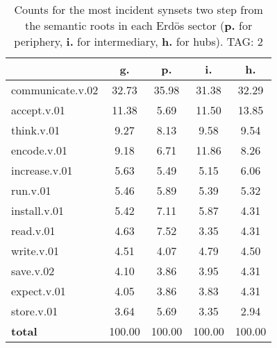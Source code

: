 \begin{table}[h!]
\begin{center}
\begin{tabular}{| l | c | c | c | c |}\hline
 & g. & p. & i. & h. \\\hline
communicate.v.02 & 32.73  & 35.98  & 31.38  & 32.29 \\\hline
accept.v.01 & 11.38  & 5.69  & 11.50  & 13.85 \\\hline
think.v.01 & 9.27  & 8.13  & 9.58  & 9.54 \\\hline
encode.v.01 & 9.18  & 6.71  & 11.86  & 8.26 \\\hline
increase.v.01 & 5.63  & 5.49  & 5.15  & 6.06 \\\hline
run.v.01 & 5.46  & 5.89  & 5.39  & 5.32 \\\hline
install.v.01 & 5.42  & 7.11  & 5.87  & 4.31 \\\hline
read.v.01 & 4.63  & 7.52  & 3.35  & 4.31 \\\hline
write.v.01 & 4.51  & 4.07  & 4.79  & 4.50 \\\hline
save.v.02 & 4.10  & 3.86  & 3.95  & 4.31 \\\hline
expect.v.01 & 4.05  & 3.86  & 3.83  & 4.31 \\\hline
store.v.01 & 3.64  & 5.69  & 3.35  & 2.94 \\\hline
{{\bf total}} & 100.00  & 100.00  & 100.00  & 100.00 \\\hline
\end{tabular}
\caption{Counts for the most incident synsets two step from the semantic roots in each Erd\"os sector ({\bf p.} for periphery, {\bf i.} for intermediary, {\bf h.} for hubs). TAG: 2}
\end{center}
\end{table}